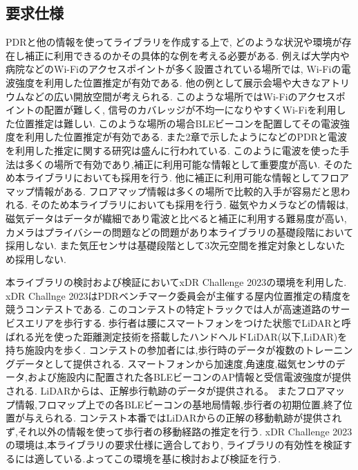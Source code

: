 

\subsection{要求仕様}
PDRと他の情報を使ってライブラリを作成する上で,
どのような状況や環境が存在し補正に利用できるのかその具体的な例を考える必要がある.
例えば大学内や病院などのWi-Fiのアクセスポイントが多く設置されている場所では,
Wi-Fiの電波強度を利用した位置推定が有効である.
他の例として展示会場や大きなアトリウムなどの広い開放空間が考えられる.
このような場所ではWi-Fiのアクセスポイントの配置が難しく,
信号のカバレッジが不均一になりやすくWi-Fiを利用した位置推定は難しい.
このような場所の場合BLEビーコンを配置してその電波強度を利用した位置推定が有効である.
また2章で示したように\cite{pdr-wifi}\cite{pdr-ble}などのPDRと電波を利用した推定に関する研究は盛んに行われている.
このように電波を使った手法は多くの場所で有効であり,補正に利用可能な情報として重要度が高い.
そのため本ライブラリにおいても採用を行う.
他に補正に利用可能な情報としてフロアマップ情報がある.
フロアマップ情報は多くの場所で比較的入手が容易だと思われる.
そのため本ライブラリにおいても採用を行う.
磁気やカメラなどの情報は,磁気データはデータが繊細であり電波と比べると補正に利用する難易度が高い,
カメラはプライバシーの問題などの問題があり本ライブラリの基礎段階において採用しない.
また気圧センサは基礎段階として3次元空間を推定対象としないため採用しない.

本ライブラリの検討および検証においてxDR Challenge 2023の環境を利用した.
xDR Challnge 2023はPDRベンチマーク委員会が主催する屋内位置推定の精度を競うコンテストである.
このコンテストの特定トラックでは人が高速道路のサービスエリアを歩行する.
歩行者は腰にスマートフォンをつけた状態でLiDARと呼ばれる光を使った距離測定技術を搭載したハンドヘルドLiDAR(以下,LiDAR)を持ち施設内を歩く.
コンテストの参加者には,歩行時のデータが複数のトレーニングデータとして提供される.
スマートフォンから加速度,角速度,磁気センサのデータ,および施設内に配置された各BLEビーコンのAP情報と受信電波強度が提供される.
LiDARからは、正解歩行軌跡のデータが提供される。
またフロアマップ情報,フロマップ上での各BLEビーコンの基地局情報,歩行者の初期位置,終了位置が与えられる.
コンテスト本番ではLiDARからの正解の移動軌跡が提供されず,それ以外の情報を使って歩行者の移動経路の推定を行う.
xDR Challenge 2023の環境は,本ライブラリの要求仕様に適合しており,
ライブラリの有効性を検証するには適している.よってこの環境を基に検討および検証を行う.
